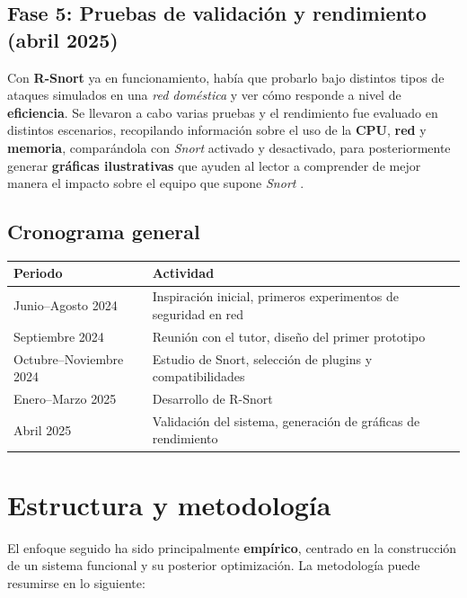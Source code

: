 \documentclass[11pt,a4paper,twoside]{report}
\begin{document}
\section{Fase 5: Pruebas de validación y rendimiento (abril 2025)}

Con \textbf{R-Snort} ya en funcionamiento, había que probarlo bajo distintos tipos de ataques simulados en una \textit{red doméstica} y ver cómo responde a nivel de \textbf{eficiencia}. Se llevaron a cabo varias pruebas y el rendimiento fue evaluado en distintos escenarios, recopilando información sobre el uso de la \textbf{CPU}, \textbf{red} y \textbf{memoria}, comparándola con \textit{Snort} activado y desactivado, para posteriormente generar \textbf{gráficas ilustrativas} que ayuden al lector a comprender de mejor manera el impacto sobre el equipo que supone \textit{Snort} \cite{kuruvila2022explainable}.

\section{Cronograma general}

\begin{center}
	\begin{tabular}{|l|l|}
		\hline
		\textbf{Periodo} & \textbf{Actividad} \\
		\hline
		Junio–Agosto 2024 & Inspiración inicial, primeros experimentos de seguridad en red \\
		Septiembre 2024 & Reunión con el tutor, diseño del primer prototipo \\
		Octubre–Noviembre 2024 & Estudio de Snort, selección de plugins y compatibilidades \\
		Enero–Marzo 2025 & Desarrollo de R-Snort \\
		Abril 2025 & Validación del sistema, generación de gráficas de rendimiento \\
		\hline
	\end{tabular}
\end{center}



\chapter{Estructura y metodología}

El enfoque seguido ha sido principalmente \textbf{empírico}, centrado en la construcción de un sistema funcional y su posterior optimización. La metodología puede resumirse en lo siguiente:
\end{document}
